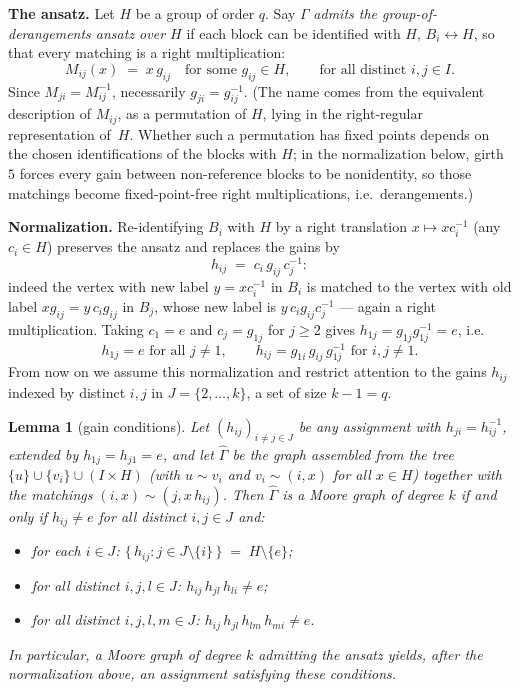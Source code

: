 \documentclass[10pt]{article}
\newtheorem{lemma}[theorem]{Lemma}
\newcommand{\id}{e}
\begin{document}
\textbf{The ansatz.} Let $H$ be a group of order $q$. Say $\Gamma$
\emph{admits the group-of-derangements ansatz over $H$} if each block
can be identified with $H$, $B_i \leftrightarrow H$, so that every
matching is a right multiplication:
\[
M_{ij}(x) \;=\; x\,g_{ij}
\quad\text{for some } g_{ij}\in H,
\qquad\text{for all distinct } i,j \in I .
\]
Since $M_{ji}=M_{ij}^{-1}$, necessarily $g_{ji}=g_{ij}^{-1}$. (The name
comes from the equivalent description of $M_{ij}$, as a permutation of
$H$, lying in the right-regular representation of~$H$. Whether such a
permutation has fixed points depends on the chosen identifications of
the blocks with $H$; in the normalization below, girth $5$ forces every
gain between non-reference blocks to be nonidentity, so those
matchings become fixed-point-free right multiplications, i.e.\
derangements.)

\textbf{Normalization.} Re-identifying $B_i$ with $H$ by a right
translation $x\mapsto x c_i^{-1}$ (any $c_i\in H$) preserves the ansatz
and replaces the gains by
\[
h_{ij} \;=\; c_i\, g_{ij}\, c_j^{-1}:
\]
indeed the vertex with new label $y=xc_i^{-1}$ in $B_i$ is matched to
the vertex with old label $xg_{ij}=y\,c_i g_{ij}$ in $B_j$, whose new
label is $y\,c_i g_{ij} c_j^{-1}$ --- again a right multiplication.
Taking $c_1=\id$ and $c_j=g_{1j}$ for $j\ge 2$ gives
$h_{1j}=g_{1j}g_{1j}^{-1}=\id$, i.e.
\[
h_{1j}=\id \text{ for all } j \ne 1,
\qquad
h_{ij}=g_{1i}\,g_{ij}\,g_{1j}^{-1} \text{ for } i,j\ne 1 .
\]
From now on we assume this normalization and restrict attention to the
gains $h_{ij}$ indexed by distinct $i,j$ in $J=\{2,\dots,k\}$, a set of
size $k-1=q$.

\begin{lemma}[gain conditions]\label{lem:VTQ}
Let $(h_{ij})_{i\ne j\in J}$ be any assignment with $h_{ji}=h_{ij}^{-1}$,
extended by $h_{1j}=h_{j1}=\id$, and let $\widehat\Gamma$ be the graph
assembled from the tree $\{u\}\cup\{v_i\}\cup(I\times H)$ (with
$u\sim v_i$ and $v_i\sim(i,x)$ for all $x\in H$) together with the
matchings $(i,x)\sim(j,x\,h_{ij})$. Then $\widehat\Gamma$ is a Moore
graph of degree $k$ if and only if
$h_{ij}\ne\id$ for all distinct $i,j\in J$ and:
\begin{itemize}
\item[(V)] for each $i\in J$:\quad
$\{\,h_{ij} : j\in J\setminus\{i\}\,\}\;=\;H\setminus\{\id\}$;
\item[(T)] for all distinct $i,j,l\in J$:\quad
$h_{ij}\,h_{jl}\,h_{li}\neq \id$;
\item[(Q)] for all distinct $i,j,l,m\in J$:\quad
$h_{ij}\,h_{jl}\,h_{lm}\,h_{mi}\neq \id$.
\end{itemize}
In particular, a Moore graph of degree $k$ admitting the ansatz yields,
after the normalization above, an assignment satisfying these
conditions.
\end{lemma}
\end{document}
